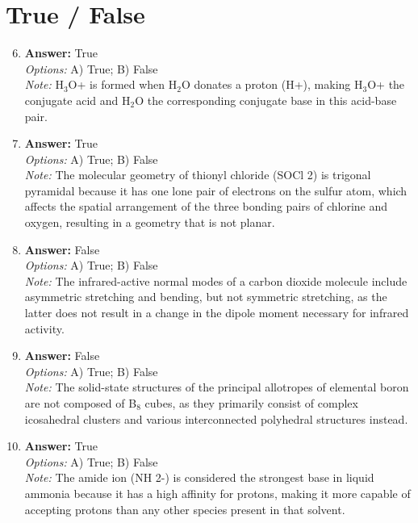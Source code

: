 \documentclass[12pt]{article}
\begin{document}
\section*{True / False}
\begin{enumerate}[label=\arabic*.]
\setcounter{enumi}{5}
\item \textbf{Answer:} True
\\ \textit{Options:} A) True; B) False
\\ \textit{Note:} H$_{3}$O+ is formed when H$_{2}$O donates a proton (H+), making H$_{3}$O+ the conjugate acid and H$_{2}$O the corresponding conjugate base in this acid-base pair.
\item \textbf{Answer:} True
\\ \textit{Options:} A) True; B) False
\\ \textit{Note:} The molecular geometry of thionyl chloride (SOCl 2) is trigonal pyramidal because it has one lone pair of electrons on the sulfur atom, which affects the spatial arrangement of the three bonding pairs of chlorine and oxygen, resulting in a geometry that is not planar.
\item \textbf{Answer:} False
\\ \textit{Options:} A) True; B) False
\\ \textit{Note:} The infrared-active normal modes of a carbon dioxide molecule include asymmetric stretching and bending, but not symmetric stretching, as the latter does not result in a change in the dipole moment necessary for infrared activity.
\item \textbf{Answer:} False
\\ \textit{Options:} A) True; B) False
\\ \textit{Note:} The solid-state structures of the principal allotropes of elemental boron are not composed of B$_{8}$ cubes, as they primarily consist of complex icosahedral clusters and various interconnected polyhedral structures instead.
\item \textbf{Answer:} True
\\ \textit{Options:} A) True; B) False
\\ \textit{Note:} The amide ion (NH 2-) is considered the strongest base in liquid ammonia because it has a high affinity for protons, making it more capable of accepting protons than any other species present in that solvent.
\end{enumerate}
\end{document}
